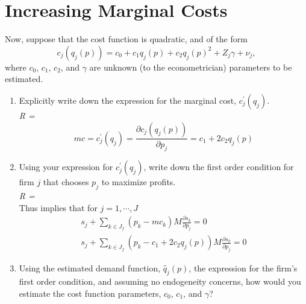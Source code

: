 \documentclass[english,12pt]{article}
\begin{document}
\section{Increasing Marginal Costs}
Now, suppose that the cost function is quadratic, and of the form
\[ c_j\left(q_j(p)\right) = c_0 + c_1q_j(p) + c_2q_j(p)^2 + Z_j\gamma + \nu_j , \]
where $c_0$, $c_1$, $c_2$, and $\gamma$ are unknown (to the econometrician) parameters to be estimated.
\begin{enumerate}
	\item Explicitly write down the expression for the marginal cost, $c_j^\prime(q_j)$.\\
\textit{R = }\\
	\[
mc = 	c_j^\prime (q_j) = \frac{\partial c_j\left(q_j(p)\right)}{ \partial p_j} = c_1+ 2 c_2 q_j(p)
	\]
	
	\item Using your expression for $c_j^\prime(q_j)$, write down the first order condition for firm $j$ that chooses $p_j$ to maximize profits.\\
\textit{R = }	\\
Thus implies that for $j = 1, \cdots ,J$ 
\begin{align*}
	s_j + \sum_{k \in J_f} (p_k - mc_k) M \frac{\partial s_k}{\partial p_j} = 0 \\
	s_j + \sum_{k \in J_f} (p_k - c_1+ 2 c_2 q_j(p)) M \frac{\partial s_k}{\partial p_j} = 0
\end{align*}

	
	\item Using the estimated demand function, $\hat q_j(p)$, the expression for the firm's first order condition, and assuming no endogeneity concerns, how would you estimate the cost function parameters, $c_0$, $c_1$, and $\gamma$?
\end{enumerate}



\end{document}

